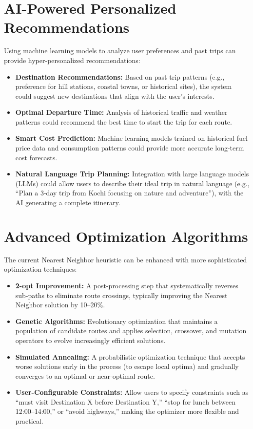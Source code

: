 \section{AI-Powered Personalized Recommendations}
Using machine learning models to analyze user preferences and past trips can provide hyper-personalized recommendations:
\begin{itemize}
    \item \textbf{Destination Recommendations:} Based on past trip patterns (e.g., preference for hill stations, coastal towns, or historical sites), the system could suggest new destinations that align with the user's interests.
    \item \textbf{Optimal Departure Time:} Analysis of historical traffic and weather patterns could recommend the best time to start the trip for each route.
    \item \textbf{Smart Cost Prediction:} Machine learning models trained on historical fuel price data and consumption patterns could provide more accurate long-term cost forecasts.
    \item \textbf{Natural Language Trip Planning:} Integration with large language models (LLMs) could allow users to describe their ideal trip in natural language (e.g., ``Plan a 3-day trip from Kochi focusing on nature and adventure''), with the AI generating a complete itinerary.
\end{itemize}

\section{Advanced Optimization Algorithms}
The current Nearest Neighbor heuristic can be enhanced with more sophisticated optimization techniques:
\begin{itemize}
    \item \textbf{2-opt Improvement:} A post-processing step that systematically reverses sub-paths to eliminate route crossings, typically improving the Nearest Neighbor solution by 10--20\%.
    \item \textbf{Genetic Algorithms:} Evolutionary optimization that maintains a population of candidate routes and applies selection, crossover, and mutation operators to evolve increasingly efficient solutions.
    \item \textbf{Simulated Annealing:} A probabilistic optimization technique that accepts worse solutions early in the process (to escape local optima) and gradually converges to an optimal or near-optimal route.
    \item \textbf{User-Configurable Constraints:} Allow users to specify constraints such as ``must visit Destination X before Destination Y,'' ``stop for lunch between 12:00--14:00,'' or ``avoid highways,'' making the optimizer more flexible and practical.
\end{itemize}

